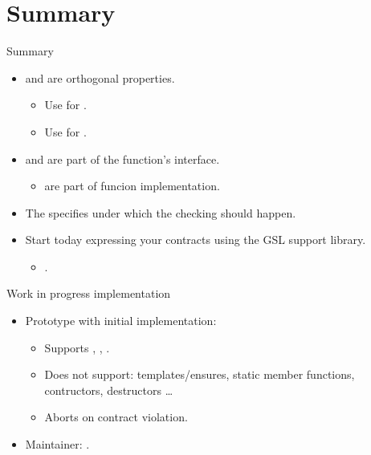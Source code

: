 \section{Summary}

\begin{frame}[t]{Summary}
\begin{itemize}
  \item {} and  are orthogonal properties.
    \begin{itemize}
      \item Use  for .
      \item Use  for .
    \end{itemize}

  \vfill\pause
  \item {} and  are part of the
        function's interface.
    \begin{itemize}
      \item {} are part of funcion implementation.
    \end{itemize}

  \vfill\pause
  \item The  specifies under which 
        the checking should happen.

  \vfill\pause
  \item Start today expressing your contracts using the GSL support library.
    \begin{itemize}
      \item {}.
    \end{itemize}
\end{itemize}
\end{frame}

\begin{frame}[t]{Work in progress implementation}
\begin{itemize}
  \item Prototype with initial implementation:
    \begin{itemize}
      \item Supports , , .
      \item Does not support: templates/ensures, static member functions, contructors, destructors \ldots
      \item Aborts on contract violation.
    \end{itemize}
  \vspace{1em}
  \item Maintainer: .
  \vspace{1em}
\end{itemize}
\end{frame}
